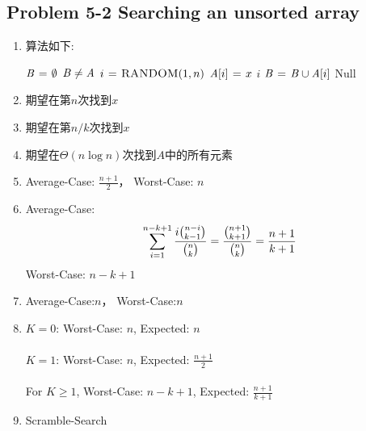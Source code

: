 \subsection*{Problem 5-2 Searching an unsorted array}
\begin{enumerate}
	\item	算法如下:
		\begin{codebox}
		\li	$\id{B} \gets \emptyset$
		\li	\While $\id{B} \neq \id{A}$
		\li	\Do
				$i \mathrel{\hspace{1pt}=\hspace{1pt}} \textnormal{\scshape RANDOM}(1, n)$
		\li		\If $\id{A}[i] \gets x$
		\li		\Then
					\Return $i$
				\End
		\li		$\id{B} \gets \id{B} \cup \id{A}[i]$
			\End
		\li	\Return Null
		\end{codebox}
	\item	期望在第$n$次找到$x$
	\item	期望在第$n/k$次找到$x$
	\item	期望在$\Theta(n \log n)$次找到$A$中的所有元素
	\item	Average-Case: $\frac{n+1}{2}$， Worst-Case: $n$
	\item	Average-Case:
		\begin{equation} \notag
			\sum_{i = 1}^{n - k + 1} \frac{i \binom{n - i}{k - 1}}{\binom{n}{k}} = \frac{\binom{n + 1}{k + 1}}{\binom{n}{k}} = \frac{n + 1}{k + 1}
		\end{equation}
		Worst-Case: $n - k + 1$
	\item	Average-Case:$n$， Worst-Case:$n$
	\item	$K = 0$: Worst-Case: $n$, Expected: $n$ \\ \\
		$K = 1$: Worst-Case: $n$, Expected: $\frac{n+1}{2}$ \\ \\
		For $K \geq 1$, Worst-Case: $n - k + 1$, Expected: $\frac{n + 1}{k + 1}$
	\item	Scramble-Search
\end{enumerate}

